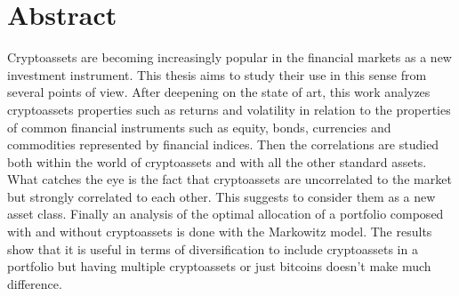 \chapter{Abstract}
\label{chpr:abstract}


Cryptoassets are becoming increasingly popular in the financial markets as a new investment instrument. This thesis aims to study their use in this sense from several points of view. After deepening on the state of art, this work analyzes cryptoassets properties such as returns and volatility in relation to the properties of common financial instruments such as equity, bonds, currencies and commodities represented by financial indices. Then the correlations are studied both within the world of cryptoassets and with all the other standard assets. What catches the eye is the fact that cryptoassets are uncorrelated to the market but strongly correlated to each other. This suggests to consider them as a new asset class.
Finally an analysis of the optimal allocation of a portfolio composed with and without cryptoassets is done with the Markowitz model.
The results show that it is useful in terms of diversification to include cryptoassets in a portfolio but having multiple cryptoassets or just bitcoins doesn't make much difference.
